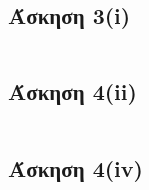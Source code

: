 \documentclass[a4paper,10pt]{article} \usepackage{anysize}
\begin{document}


\section*{} \setcounter{section}{1}
\subsection*{Άσκηση 3(i)}
\inputminted[linenos,obeytabs,frame=leftline,fontsize=\footnotesize]{oldasm}{../askhsh_3_i.8085}
\pagebreak
\subsection*{Άσκηση 4(ii)}
\inputminted[linenos,obeytabs,frame=leftline,fontsize=\footnotesize]{oldasm}{../askhsh_4_ii.8085}
\pagebreak
\subsection*{Άσκηση 4(iv)}
\inputminted[linenos,obeytabs,frame=leftline,fontsize=\footnotesize]{oldasm}{../askhsh_4_iv.8085}
\pagebreak
\end{document}
